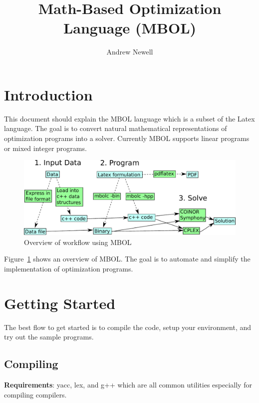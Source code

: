 \documentclass{article}
\newcommand{\subheader}[1]{
    \vspace{0.5in}
    \noindent\textbf{#1}:
}
\begin{document}
\title{Math-Based Optimization Language (MBOL)}

\author{Andrew Newell}

\maketitle

\tableofcontents

\section{Introduction}

This document should explain the MBOL language which is a subset of the Latex language. The goal is to convert natural mathematical representations of optimization programs into a solver. Currently MBOL supports linear programs or mixed integer programs.

\begin{figure}
    \includegraphics[width=\textwidth]{figures/mbol-overview.pdf}
    \caption{Overview of workflow using MBOL}
    \label{lab:overview}
\end{figure}

Figure~\ref{lab:overview} shows an overview of MBOL. The goal is to automate and simplify the implementation of optimization programs.

\section{Getting Started}

The best flow to get started is to compile the code, setup your environment, and try out the sample programs.

\subsection{Compiling}

\subheader{Requirements} yacc, lex, and g++ which are all common utilities especially for compiling compilers.
\end{document}
